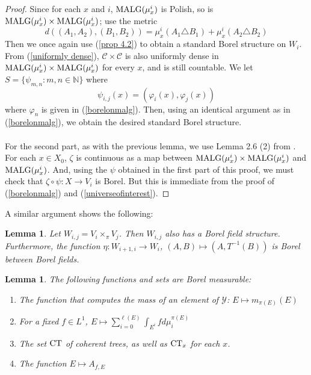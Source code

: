 \documentclass{article}
\newcommand{\malg}[1]{\textmd{MALG}(#1)}
\newcommand{\CT}{\textmd{CT}}
\let\oldref\ref
\renewcommand{\ref}[1]{(\oldref{#1})}
\newtheorem{lemma}[theorem]{Lemma}
\theoremstyle{definition}
\begin{document}
\begin{proof}
    Since for each $ x $ and $ i $, $ \malg{\mu_x^i} $ is Polish, so is $ \malg{\mu_x^i}\times \malg{\mu_x^i} $; use the metric 
    \[
    d((A_1,A_2),(B_1,B_2)) = \mu_x^i(A_1\triangle B_1)+\mu_x^i(A_2\triangle B_2) 
    \] 
    Then we once again use \ref{prop 4.2} to obtain a standard Borel structure on $ W_i $. From \ref{uniformly dense}, $ \mathcal{C}\times \mathcal{C} $ is also uniformly dense in $ \malg{\mu_x^i}\times \malg{\mu_x^i} $ for every $ x $, and is still countable. We let $ S = \{\psi_{m,n}:m,n\in \mathbb{N}\} $ where
    \[     
    \psi_{i,j}(x) = (\varphi_i(x),\varphi_j(x))     
    \] 
    where $ \varphi_n $ is given in \ref{borelonmalg}. Then, using an identical argument as in \ref{borelonmalg}, we obtain the desired standard Borel structure. \\\\
    For the second part, as with the previous lemma, we use Lemma 2.6 (2) from \cite{borelfieldpaper}. For each $ x \in X_0 $, $ \zeta $ is continuous as a map between $ \malg{\mu_x^i}\times \malg{\mu_x^i} $ and $ \malg{\mu_x^{i}} $. And, using the $ \psi $ obtained in the first part of this proof, we must check that $ \zeta\circ \psi: X\rightarrow V_i $ is Borel. But this is immediate from the proof of \ref{borelonmalg} and \ref{universeofinterest}.
\end{proof}
\noindent A similar argument shows the following:
\begin{lemma}\label{third lem}
    Let $ W_{i,j} = V_i\times_\pi V_j $. Then $ W_{i,j} $ also has a Borel field structure. Furthermore, the function $ \eta:W_{i+1,i}\rightarrow W_i $, $ (A,B)\mapsto (A,T^{-1}(B)) $ is Borel between Borel fields.
\end{lemma}
\begin{lemma}\label{BorelCT}
    The following functions and sets are Borel measurable:
    \begin{enumerate}
        \item The function that computes the mass of an element of $ \mathcal{Y} $:  $E\mapsto m_{\pi(E)}(E) $
        \item For a fixed $ f\in L^1 $, $ E \mapsto \sum_{i=0}^{\ell(E)} \int_{E^i}fd\mu_i^{\pi(E)}$
        \item The set $ \CT $ of coherent trees, as well as $ \CT_x $ for each $ x $.
        \item The function $ E\mapsto A_{f,E} $
    \end{enumerate}
\end{lemma}
\end{document}

